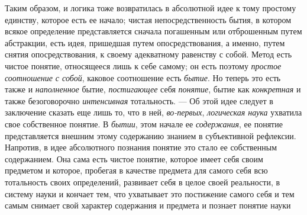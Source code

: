 \documentclass[twoside]{article}
\begin{document}
{{Таким образом, и логика тоже возвратилась в абсолютной идее к
тому простому единству, которое есть ее начало; чистая непосредственность
бытия, в котором всякое определение представляется сначала погашенным или
отброшенным путем абстракции, есть идея, пришедшая путем опосредствования,
а именно, путем снятия опосредствования, к своему адекватному равенству с
собой. Метод есть чистое понятие, относящееся лишь к себе самому; он есть
поэтому {\em простое соотношение с
собой}, каковое соотношение есть
{\em бытие}. Но теперь
это есть также и {\em наполненное}
бытие, {\em постигающее}
себя {\em понятие},
бытие как
{\em конкретная} и также
безоговорочно {\em интенсивная}
тотальность. — Об этой идее следует в
заключение сказать еще лишь то, что в ней,
{\em во-первых},
{\em логическая наука
}ухватила свое собственное понятие. В
{\em бытии}, этом начале
ее {\em содержания}, ее
понятие представляется внешним этому содержанию знанием в субъективной
рефлексии. Напротив, в идее абсолютного познания понятие это стало ее
собственным содержанием. Она сама есть чистое понятие, которое имеет себя
своим предметом и которое, пробегая в качестве предмета для самого себя всю
тотальность своих определений, развивает себя в целое своей реальности, в
систему науки и кончает тем, что ухватывает это постижение самого себя и
тем самым снимает свой характер содержания и предмета и познает понятие
науки~}}
\end{document}
